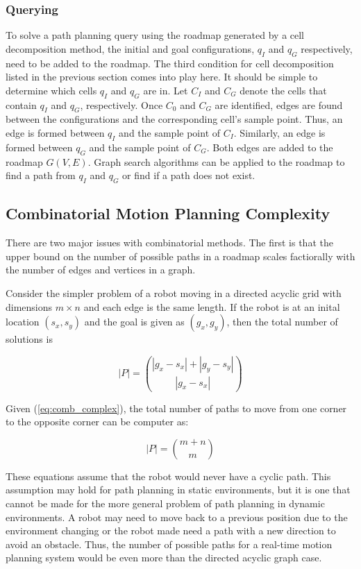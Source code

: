 \documentclass[10pt,conference]{ieeeconf}
\begin{document}
\subsubsection{Querying}

To solve a path planning query using the roadmap generated by a cell decomposition method, the initial and goal configurations, $q_I$ and $q_G$ respectively, need to be added to the roadmap. The third condition for cell decomposition listed in the previous section comes into play here. It should be simple to determine which cells $q_I$ and $q_G$ are in. Let $C_I$ and $C_G$ denote the cells that contain $q_I$ and $q_G$, respectively. Once $C_0$ and $C_G$ are identified, edges are found between the configurations and the corresponding cell's sample point. Thus, an edge is formed between $q_I$ and the sample point of $C_I$. Similarly, an edge is formed between $q_G$ and the sample point of $C_G$. Both edges are added to the roadmap $G(V,E)$. Graph search algorithms can be applied to the roadmap to find a path from $q_I$ and $q_G$ or find if a path does not exist.


\subsection{Combinatorial Motion Planning Complexity}

There are two major issues with combinatorial methods. The first is that the upper bound on the number of possible paths in a roadmap scales factiorally with the number of edges and vertices in a graph. 

Consider the simpler problem of a robot moving in a directed acyclic grid with dimensions $m \times n$ and each edge is the same length. If the robot is at an inital location $(s_x, s_y)$ and the goal is given as $(g_x, g_y)$, then the total number of solutions is 

\begin{equation}\label{eq:comb_complex}
|P| = { |g_x-s_x|+|g_y-s_y| \choose |g_x-s_x| }
\end{equation}

Given (\ref{eq:comb_complex}), the total number of paths to move from one corner to the opposite corner can be computer as:

\begin{equation}
|P| = {m+n \choose m}
\end{equation}

These equations assume that the robot would never have a cyclic path. This assumption may hold for path planning in static environments, but it is one that cannot be made for the more general problem of path planning in dynamic environments. A robot may need to move back to a previous position due to the environment changing or the robot made need a path with a new direction to avoid an obstacle. Thus, the number of possible paths for a real-time motion planning system would be even more than the directed acyclic graph case. 
\end{document}
